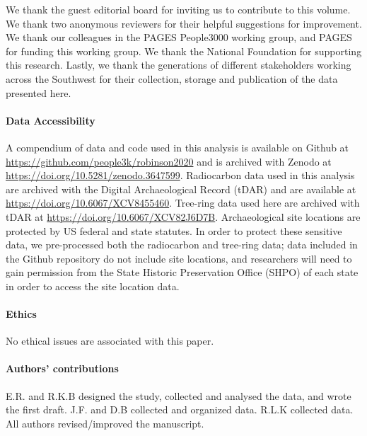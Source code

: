 \documentclass[
]{article}
\begin{document}
We thank the guest editorial board for inviting us to contribute to this volume. We thank two anonymous reviewers for their helpful suggestions for improvement. We thank our colleagues in the PAGES People3000 working group, and PAGES for funding this working group. We thank the National Foundation for supporting this research. Lastly, we thank the generations of different stakeholders working across the Southwest for their collection, storage and publication of the data presented here.

\hypertarget{data-accessibility}{%
\paragraph*{Data Accessibility}\label{data-accessibility}}

A compendium of data and code used in this analysis is available on Github at \url{https://github.com/people3k/robinson2020} and is archived with Zenodo at \url{https://doi.org/10.5281/zenodo.3647599}. Radiocarbon data used in this analysis are archived with the Digital Archaeological Record (tDAR) and are available at \url{https://doi.org/10.6067/XCV8455460}. Tree-ring data used here are archived with tDAR at \url{https://doi.org/10.6067/XCV82J6D7B}. Archaeological site locations are protected by US federal and state statutes. In order to protect these sensitive data, we pre-processed both the radiocarbon and tree-ring data; data included in the Github repository do not include site locations, and researchers will need to gain permission from the State Historic Preservation Office (SHPO) of each state in order to access the site location data.

\hypertarget{ethics}{%
\paragraph*{Ethics}\label{ethics}}

No ethical issues are associated with this paper.

\hypertarget{authors-contributions}{%
\paragraph*{Authors' contributions}\label{authors-contributions}}

E.R. and R.K.B designed the study, collected and analysed the data, and wrote the first draft. J.F. and D.B collected and organized data. R.L.K collected data. All authors revised/improved the manuscript.
\end{document}
